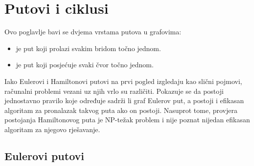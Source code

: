 \chapter{Putovi i ciklusi}

Ovo poglavlje bavi se dvjema vrstama putova u grafovima:
\begin{itemize}
\item {} je put koji
prolazi svakim bridom točno jednom.
\item {} je put
koji posjećuje svaki čvor točno jednom.
\end{itemize}

Iako Eulerovi i Hamiltonovi putovi na prvi pogled izgledaju
kao slični pojmovi,
računalni problemi vezani uz njih
vrlo su različiti.
Pokazuje se da postoji jednostavno pravilo koje
određuje sadrži li graf Eulerov put,
a postoji i efikasan algoritam za
pronalazak takvog puta ako on postoji.
Nasuprot tome, provjera postojanja Hamiltonovog puta je NP-težak
problem i nije poznat nijedan efikasan algoritam za njegovo rješavanje.

\section{Eulerovi putovi}


